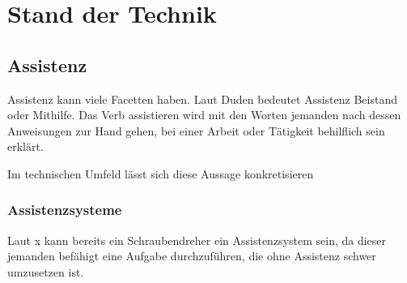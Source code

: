 
\chapter{Stand der Technik}
\label{sec:StandDerTechnik}


\section{Assistenz}
Assistenz kann viele Facetten haben. Laut Duden bedeutet Assistenz Beistand oder Mithilfe. Das Verb assistieren wird mit den Worten jemanden nach dessen Anweisungen zur Hand gehen, bei einer Arbeit oder Tätigkeit behilflich sein erklärt.

Im technischen Umfeld lässt sich diese Aussage konkretisieren

\subsection{Assistenzsysteme}
Laut x kann bereits ein Schraubendreher ein Assistenzsystem sein, da dieser jemanden befähigt eine Aufgabe durchzuführen, die ohne Assistenz schwer umzusetzen ist.